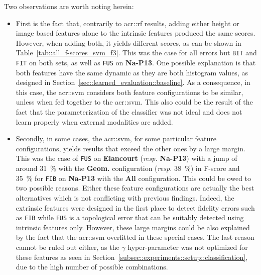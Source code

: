         Two observations are worth noting herein:
        \begin{itemize}[label=\(\blacktriangleright\)]
            \item First is the fact that, contrarily to \gls{acr::rf} results, adding either height or image based features alone to the intrinsic features produced the same scores.
                    However, when adding both, it yields different scores, as can be shown in Table~\ref{tab::all_f-scores_svm_f3}.
                    This was the case for all errors but \texttt{BIT} and \texttt{FIT} on both sets, as well as \texttt{FUS} on \textbf{Na-P13}.
                    One possible explanation is that both features have the same dynamic as they are both histogram values, as designed in Section~\ref{sec::learned_evaluation::baseline}.
                    As a consequence, in this case, the \gls{acr::svm} considers both feature configurations to be similar, unless when fed together to the \gls{acr::svm}.
                    This also could be the result of the fact that the parameterization of the classifier was not ideal and does not learn properly when external modalities are added.
            \item Secondly, in some cases, the \gls{acr::svm}, for some particular feature configurations, yields results that exceed the other ones by a large margin.
                    This was the case of \texttt{FUS} on \textbf{Elancourt} (\textit{resp.} \textbf{Na-P13}) with a jump of around \SI{31}{\percent} with the \textbf{Geom.} configuration (\textit{resp.} \SI{38}{\percent}) in F-score and \SI{35}{\percent} for \texttt{FIB} on \textbf{Na-P13} with the \textbf{All} configuration.
                    This could be owed to two possible reasons.
                    Either these feature configurations are actually the best alternatives which is not conflicting with previous findings.
                    Indeed, the extrinsic features were designed in the first place to detect fidelity errors such as \texttt{FIB} while \texttt{FUS} is a topological error that can be suitably detected using intrinsic features only.
                    However, these large margins could be also explained by the fact that the \gls{acr::svm} overfitted in these special cases.
                    The last reason cannot be ruled out either, as the \(\gamma\) hyper-parameter was not optimized for these features as seen in Section~\ref{subsec::experiments::setup::classification}, due to the high number of possible combinations.
            \end{itemize}
            
